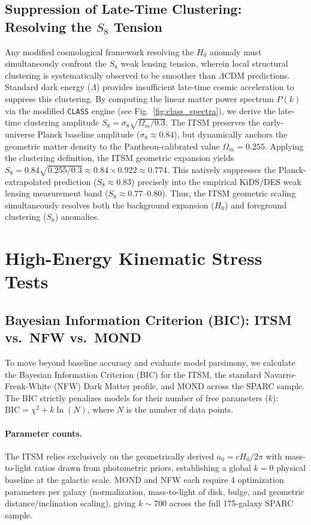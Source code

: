 \documentclass[aps,prd,10pt,twocolumn,superscriptaddress,nofootinbib,floatfix]{revtex4-2}
\begin{document}
\subsection{Suppression of Late-Time Clustering: Resolving the \texorpdfstring{$S_8$}{S8} Tension}
Any modified cosmological framework resolving the $H_0$ anomaly must simultaneously confront the $S_8$ weak lensing tension, wherein local structural clustering is systematically observed to be smoother than $\Lambda$CDM predictions. Standard dark energy ($\Lambda$) provides insufficient late-time cosmic acceleration to suppress this clustering. By computing the linear matter power spectrum $P(k)$ via the modified \texttt{CLASS} engine (see Fig.~\ref{fig:class_spectra}), we derive the late-time clustering amplitude $S_8 = \sigma_8 \sqrt{\Omega_m/0.3}$. The ITSM preserves the early-universe Planck baseline amplitude ($\sigma_8 \approx 0.84$), but dynamically anchors the geometric matter density to the Pantheon-calibrated value $\Omega_m = 0.255$. Applying the clustering definition, the ITSM geometric expansion yields $S_8 = 0.84 \sqrt{0.255/0.3} \approx 0.84 \times 0.922 \approx 0.774$. This natively suppresses the Planck-extrapolated prediction ($S_8 \approx 0.83$) precisely into the empirical KiDS/DES weak lensing measurement band ($S_8 \approx 0.77$--$0.80$). Thus, the ITSM geometric scaling simultaneously resolves both the background expansion ($H_0$) and foreground clustering ($S_8$) anomalies.

\section{High-Energy Kinematic Stress Tests}

\subsection{\label{sec:bic}Bayesian Information Criterion (BIC): ITSM vs.\ NFW vs.\ MOND}
To move beyond baseline accuracy and evaluate model parsimony, we calculate the Bayesian Information Criterion (BIC) for the ITSM, the standard Navarro-Frenk-White (NFW) Dark Matter profile, and MOND across the SPARC sample. The BIC strictly penalizes models for their number of free parameters ($k$): $\text{BIC} = \chi^2 + k \ln(N)$, where $N$ is the number of data points.

\paragraph{Parameter counts.} The ITSM relies exclusively on the geometrically derived $a_0 = cH_0/2\pi$ with mass-to-light ratios drawn from photometric priors, establishing a global $k=0$ physical baseline at the galactic scale. MOND \cite{mond,famaey_mcgaugh} and NFW each require 4 optimization parameters per galaxy (normalization, mass-to-light of disk, bulge, and geometric distance/inclination scaling), giving $k \sim 700$ across the full 175-galaxy SPARC sample.
\end{document}
